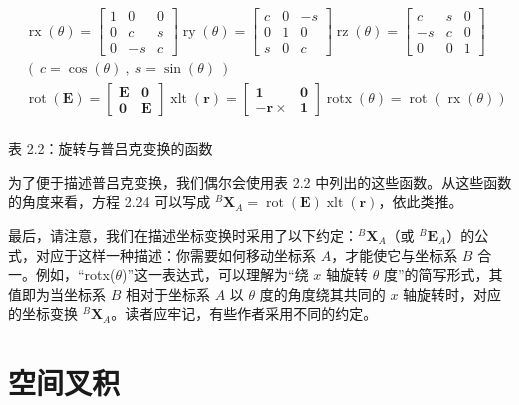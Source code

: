 \documentclass[10pt,a4paper]{book}
\theoremstyle{thmstyle} %
\theoremstyle{defstyle} %
\theoremstyle{prostyle} %
\begin{document}
$$
\begin{aligned}&\operatorname{rx}(\theta)=\begin{bmatrix}1&0&0\\0&c&s\\0&-s&c\end{bmatrix}\operatorname{ry}(\theta)=\begin{bmatrix}c&0&-s\\0&1&0\\s&0&c\end{bmatrix}\operatorname{rz}(\theta)=\begin{bmatrix}c&s&0\\-s&c&0\\0&0&1\end{bmatrix}\\&(\:c=\cos(\theta)\:,\:s=\sin(\theta)\:)\\&\operatorname{rot}(\boldsymbol{E})=\begin{bmatrix}\boldsymbol{E}&\boldsymbol{0}\\\boldsymbol{0}&\boldsymbol{E}\end{bmatrix}\operatorname{xlt}(\boldsymbol{r})=\begin{bmatrix}\boldsymbol{1}&\boldsymbol{0}\\-\boldsymbol{r}\times&\boldsymbol{1}\end{bmatrix}\operatorname{rotx}(\theta)=\operatorname{rot}(\operatorname{rx}(\theta))\\\end{aligned}
$$



表 2.2：旋转与普吕克变换的函数



为了便于描述普吕克变换，我们偶尔会使用表 2.2 中列出的这些函数。从这些函数的角度来看，方程 2.24 可以写成 $^{B}\mathbf{X}_{A}=\operatorname{rot}(\mathbf{E})\operatorname{xlt}(\mathbf{r})$，依此类推。



最后，请注意，我们在描述坐标变换时采用了以下约定：$^{B}\mathbf{X}_{A}$（或 $^{B}\mathbf{E}_{A}$）的公式，对应于这样一种描述：你需要如何移动坐标系 $A$，才能使它与坐标系 $B$ 合一。例如，“rotx($\theta$)”这一表达式，可以理解为“绕 $x$ 轴旋转 $\theta$ 度”的简写形式，其值即为当坐标系 $B$ 相对于坐标系 $A$ 以 $\theta$ 度的角度绕其共同的 $x$ 轴旋转时，对应的坐标变换 $^{B}\mathbf{X}_{A}$。读者应牢记，有些作者采用不同的约定。



\section{空间叉积}
\end{document}
